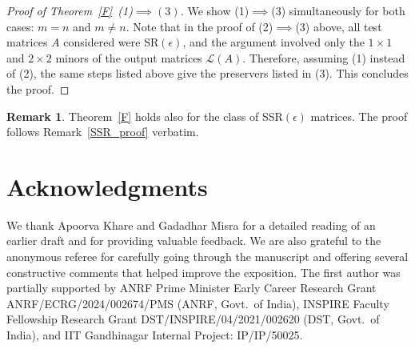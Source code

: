 \documentclass[11pt,reqno]{amsart}
\theoremstyle{plain}
\theoremstyle{definition}
\newtheorem{rem}[theorem]{Remark}
\numberwithin{equation}{section}
\begin{document}
\begin{proof}[Proof of Theorem~\ref{F}~(1)$\implies(3)$] 
	We show (1)$\implies$(3) simultaneously for both cases: $m=n$ and $m\neq n$. Note that in the proof of (2)$\implies$(3) above, all test matrices $A$ considered were SR$(\epsilon)$, and the argument involved only the $1\times1$ and $2\times2$ minors of the output matrices $\mathcal{L}(A)$. Therefore, assuming (1) instead of (2), the same steps listed above give the preservers listed in (3). This concludes the proof.
\end{proof}

\begin{rem}
	Theorem~\ref{F} holds also for the class of SSR$(\epsilon)$ matrices. The proof follows Remark~\ref{SSR_proof} verbatim.
\end{rem}	
	
	\section*{Acknowledgments}
	We thank Apoorva Khare and Gadadhar Misra for a detailed reading of an earlier draft and for providing valuable feedback. We are also grateful to the anonymous referee for carefully going through the manuscript and offering several constructive comments that helped improve the exposition. The first author was partially supported by ANRF Prime Minister Early Career Research Grant ANRF/ECRG/2024/002674/PMS (ANRF, Govt.~of India), INSPIRE Faculty Fellowship Research Grant DST/INSPIRE/04/2021/002620 (DST, Govt.~of India), and IIT Gandhinagar Internal Project: IP/IP/50025.	
	
\end{document}
